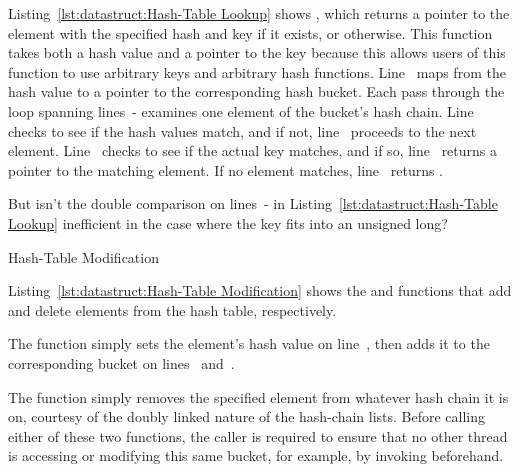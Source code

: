 \begin{lineref}
Listing~\ref{lst:datastruct:Hash-Table Lookup}
shows ,
which returns a pointer to the element with the specified hash and key if it
exists, or  otherwise.
This function takes both a hash value and a pointer to the key because
this allows users of this function to use arbitrary keys and
arbitrary hash functions.
Line~ maps from the hash value to a pointer to the corresponding
hash bucket.
Each pass through the loop spanning
lines~- examines one element
of the bucket's hash chain.
Line~ checks to see if the hash values match, and if not,
line~
proceeds to the next element.
Line~ checks to see if the actual key matches, and if so,
line~ returns a pointer to the matching element.
If no element matches, line~ returns .
\end{lineref}

\QuickQuiz{}
	\begin{lineref}
	But isn't the double comparison on
	lines~- in
	Listing~\ref{lst:datastruct:Hash-Table Lookup} inefficient
	in the case where the key fits into an unsigned long?
	\end{lineref}
 \QuickQuizEnd

\begin{listing}[tb]

\caption{Hash-Table Modification}
\label{lst:datastruct:Hash-Table Modification}
\end{listing}

Listing~\ref{lst:datastruct:Hash-Table Modification}
shows the  and  functions
that add and delete elements from the hash table, respectively.

\begin{lineref}
The  function simply sets the element's hash
value on line~, then adds it to the corresponding bucket on
lines~ and~.
\end{lineref}
The  function simply removes the specified element
from whatever hash chain it is on, courtesy of the doubly linked
nature of the hash-chain lists.
Before calling either of these two functions, the caller is required to
ensure that no other thread is accessing
or modifying this same bucket, for example, by invoking
 beforehand.

